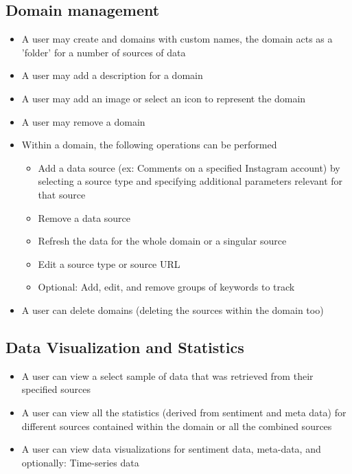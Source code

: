 \documentclass[12pt]{article}
\begin{document}
\subsection{Domain management}
\begin{itemize}
  \item A user may create and domains with custom names, the domain acts as a 'folder' for a number of sources of data
  \item A user may add a description for a domain
  \item A user may add an image or select an icon to represent the domain
  \item A user may remove a domain
  \item Within a domain, the following operations can be performed
        \begin{itemize}
          \item Add a data source (ex: Comments on a specified Instagram account) by selecting a source type and specifying additional parameters relevant for that source
          \item Remove a data source
          \item Refresh the data for the whole domain or a singular source
          \item Edit a source type or source URL
          \item Optional: Add, edit, and remove groups of keywords to track
        \end{itemize}
  \item A user can delete domains (deleting the sources within the domain too)
\end{itemize}

\subsection{Data Visualization and Statistics}
\begin{itemize}
  \item A user can view a select sample of data that was retrieved from their specified sources
  \item A user can view all the statistics (derived from sentiment and meta data) for different sources contained within the domain or all the combined sources
  \item A user can view data visualizations for sentiment data, meta-data, and optionally: Time-series data
\end{itemize}
\end{document}
